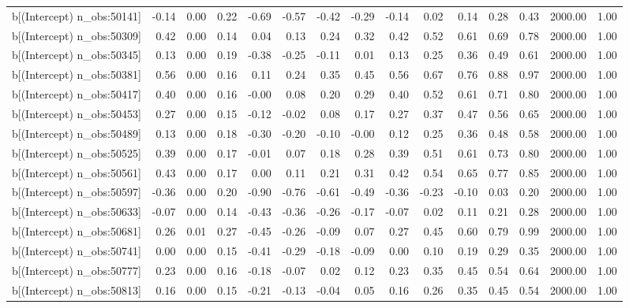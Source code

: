 \begin{table}[ht]
\begin{tabular}{rrrrrrrrrrrrrrr}
  b[(Intercept) n\_obs:50141] & -0.14 & 0.00 & 0.22 & -0.69 & -0.57 & -0.42 & -0.29 & -0.14 & 0.02 & 0.14 & 0.28 & 0.43 & 2000.00 & 1.00 \\ 
  b[(Intercept) n\_obs:50309] & 0.42 & 0.00 & 0.14 & 0.04 & 0.13 & 0.24 & 0.32 & 0.42 & 0.52 & 0.61 & 0.69 & 0.78 & 2000.00 & 1.00 \\ 
  b[(Intercept) n\_obs:50345] & 0.13 & 0.00 & 0.19 & -0.38 & -0.25 & -0.11 & 0.01 & 0.13 & 0.25 & 0.36 & 0.49 & 0.61 & 2000.00 & 1.00 \\ 
  b[(Intercept) n\_obs:50381] & 0.56 & 0.00 & 0.16 & 0.11 & 0.24 & 0.35 & 0.45 & 0.56 & 0.67 & 0.76 & 0.88 & 0.97 & 2000.00 & 1.00 \\ 
  b[(Intercept) n\_obs:50417] & 0.40 & 0.00 & 0.16 & -0.00 & 0.08 & 0.20 & 0.29 & 0.40 & 0.52 & 0.61 & 0.71 & 0.80 & 2000.00 & 1.00 \\ 
  b[(Intercept) n\_obs:50453] & 0.27 & 0.00 & 0.15 & -0.12 & -0.02 & 0.08 & 0.17 & 0.27 & 0.37 & 0.47 & 0.56 & 0.65 & 2000.00 & 1.00 \\ 
  b[(Intercept) n\_obs:50489] & 0.13 & 0.00 & 0.18 & -0.30 & -0.20 & -0.10 & -0.00 & 0.12 & 0.25 & 0.36 & 0.48 & 0.58 & 2000.00 & 1.00 \\ 
  b[(Intercept) n\_obs:50525] & 0.39 & 0.00 & 0.17 & -0.01 & 0.07 & 0.18 & 0.28 & 0.39 & 0.51 & 0.61 & 0.73 & 0.80 & 2000.00 & 1.00 \\ 
  b[(Intercept) n\_obs:50561] & 0.43 & 0.00 & 0.17 & 0.00 & 0.11 & 0.21 & 0.31 & 0.42 & 0.54 & 0.65 & 0.77 & 0.85 & 2000.00 & 1.00 \\ 
  b[(Intercept) n\_obs:50597] & -0.36 & 0.00 & 0.20 & -0.90 & -0.76 & -0.61 & -0.49 & -0.36 & -0.23 & -0.10 & 0.03 & 0.20 & 2000.00 & 1.00 \\ 
  b[(Intercept) n\_obs:50633] & -0.07 & 0.00 & 0.14 & -0.43 & -0.36 & -0.26 & -0.17 & -0.07 & 0.02 & 0.11 & 0.21 & 0.28 & 2000.00 & 1.00 \\ 
  b[(Intercept) n\_obs:50681] & 0.26 & 0.01 & 0.27 & -0.45 & -0.26 & -0.09 & 0.07 & 0.27 & 0.45 & 0.60 & 0.79 & 0.99 & 2000.00 & 1.00 \\ 
  b[(Intercept) n\_obs:50741] & 0.00 & 0.00 & 0.15 & -0.41 & -0.29 & -0.18 & -0.09 & 0.00 & 0.10 & 0.19 & 0.29 & 0.35 & 2000.00 & 1.00 \\ 
  b[(Intercept) n\_obs:50777] & 0.23 & 0.00 & 0.16 & -0.18 & -0.07 & 0.02 & 0.12 & 0.23 & 0.35 & 0.45 & 0.54 & 0.64 & 2000.00 & 1.00 \\ 
  b[(Intercept) n\_obs:50813] & 0.16 & 0.00 & 0.15 & -0.21 & -0.13 & -0.04 & 0.05 & 0.16 & 0.26 & 0.35 & 0.45 & 0.54 & 2000.00 & 1.00 \\ 

\end{tabular}
\end{table}
